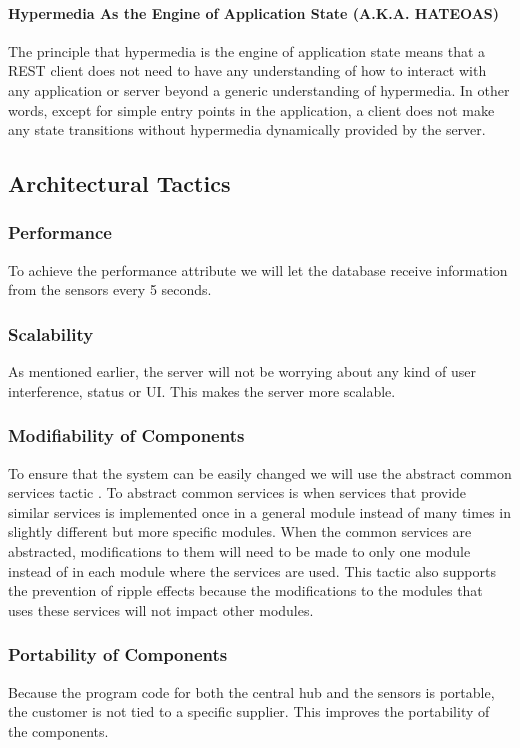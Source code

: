 \documentclass[../document.tex]{subfiles}
\begin{document}
\paragraph{Hypermedia As the Engine of Application State (A.K.A. HATEOAS)}
The principle that hypermedia is the engine of application state means that a \gls{REST} client does not need to have any understanding of how to interact with any application or server beyond a generic understanding of hypermedia. In other words, except for simple entry points in the application, a client does not make any state transitions without hypermedia dynamically provided by the server. 

\subsection{Architectural Tactics}
\subsubsection{Performance}
To achieve the performance attribute we will let the database receive information from the sensors every 5 seconds. 

\subsubsection{Scalability}
As mentioned earlier, the server will not be worrying about any kind of user interference, status or UI. This makes the server more scalable.

\subsubsection{Modifiability of Components}
To ensure that the system can be easily changed we will use the abstract common services tactic \cite{Software Architecture}. To abstract common services is when services that provide similar services is implemented once in a general module instead of many times in slightly different but more specific modules. When the common services are abstracted, modifications to them will need to be made to only one module instead of in each module where the services are used. This tactic also supports the prevention of ripple effects because the modifications to the modules that uses these services will not impact other modules.

\subsubsection{Portability of Components}
Because the program code for both the central hub and the sensors is portable, the customer is not tied to a specific supplier. This improves the portability of the components.
\end{document}
